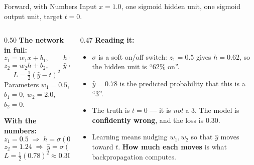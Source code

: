 \begin{frame}{Forward, with Numbers}
\small
Input $x=1.0$, one sigmoid hidden unit, one sigmoid output unit, target $t=0$.
\vspace{-1mm}
\begin{columns}[T]
\begin{column}{0.50\textwidth}
\textbf{The network in full:}
\[ z_1=w_1x+b_1,\qquad h=\sigma(z_1) \]
\[ z_2=w_2h+b_2,\qquad \hat y=\sigma(z_2) \]
\[ L=\tfrac12(\hat y-t)^2 \]
{\footnotesize Parameters $w_1=0.5$, $b_1=0$, $w_2=2.0$, $b_2=0$.}
\smallskip

\textbf{With the numbers:}
\[ z_1=0.5\;\Rightarrow\;h=\sigma(0.5)\approx0.62 \]
\[ z_2=1.24\;\Rightarrow\;\hat y=\sigma(1.24)\approx0.78 \]
\[ L=\tfrac12(0.78)^2\approx0.30 \]
\end{column}
\begin{column}{0.47\textwidth}
\textbf{Reading it:}
\begin{itemize}\small\setlength{\itemsep}{1mm}
  \item $\sigma$ is a soft on/off switch: $z_1=0.5$ gives $h=0.62$, so the hidden unit is ``62\% on''.
  \item $\hat y=0.78$ is the predicted probability that this is a ``3''.
  \item The truth is $t=0$ --- it is \emph{not} a 3. The model is \textbf{confidently wrong}, and the loss is $0.30$.
  \item Learning means nudging $w_1,w_2$ so that $\hat y$ moves toward $t$. \textbf{How much each moves} is what backpropagation computes.
\end{itemize}
\end{column}
\end{columns}
\vspace{1mm}
\end{frame}

